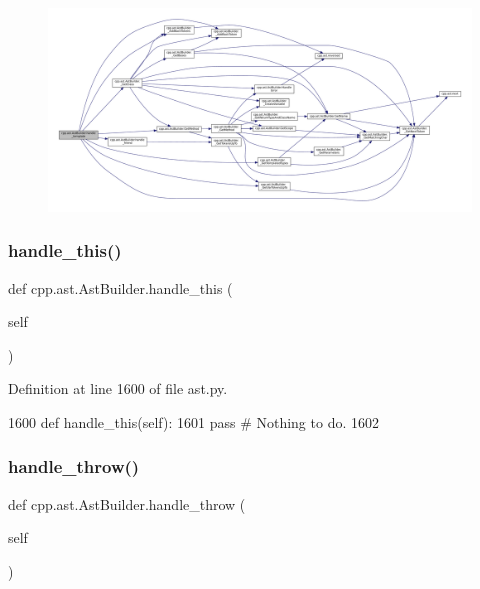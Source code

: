 \begin{figure}[H]
\begin{center}
\leavevmode
\includegraphics[width=350pt]{classcpp_1_1ast_1_1AstBuilder_a0f4d74520697ec05eb6b549daada5a5d_cgraph}
\end{center}
\end{figure}
\mbox{\label{classcpp_1_1ast_1_1AstBuilder_ad96a39776b5439fa9a5c2989f8da20cd}} 
\subsubsection{\texorpdfstring{handle\+\_\+this()}{handle\_this()}}
{\footnotesize\ttfamily def cpp.\+ast.\+Ast\+Builder.\+handle\+\_\+this (\begin{DoxyParamCaption}\item[{}]{self }\end{DoxyParamCaption})}



Definition at line 1600 of file ast.\+py.


\begin{DoxyCode}
1600     \textcolor{keyword}{def }handle\_this(self):
1601         \textcolor{keywordflow}{pass}  \textcolor{comment}{# Nothing to do.}
1602 
\end{DoxyCode}
\mbox{\label{classcpp_1_1ast_1_1AstBuilder_ad4a308ded4a1f87e686b9e11fec31be9}} 
\subsubsection{\texorpdfstring{handle\+\_\+throw()}{handle\_throw()}}
{\footnotesize\ttfamily def cpp.\+ast.\+Ast\+Builder.\+handle\+\_\+throw (\begin{DoxyParamCaption}\item[{}]{self }\end{DoxyParamCaption})}



